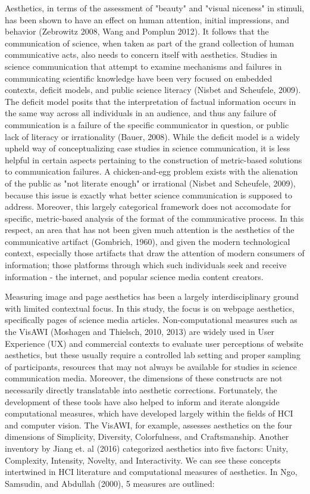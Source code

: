 \documentclass[letterpaper,12pt]{article}
\theoremstyle{definition}
\begin{document}
{Aesthetics, in terms of the assessment of "beauty" and "visual niceness" in stimuli, has been shown to have an effect on human attention, initial impressions, and behavior (Zebrowitz 2008, Wang and Pomplun 2012). It follows that the communication of science, when taken as part of the grand collection of human communicative acts, also needs to concern itself with aesthetics. Studies in science communication that attempt to examine mechanisms and failures in communicating scientific knowledge have been very focused on embedded contexts, deficit models, and public science literacy (Nisbet and Scheufele, 2009). The deficit model posits that the interpretation of factual information occurs in the same way across all individuals in an audience, and thus any failure of communication is a failure of the specific communicator in question, or public lack of literacy or irrationality (Bauer, 2008). While the deficit model is a widely upheld way of conceptualizing case studies in science communication, it is less helpful in certain aspects pertaining to the construction of metric-based solutions to communication failures. A chicken-and-egg problem exists with the alienation of the public as "not literate enough" or irrational (Nisbet and Scheufele, 2009), because this issue is exactly what better science communication is supposed to address. Moreover, this largely categorical framework does not accomodate for specific, metric-based analysis of the format of the communicative process. In this respect, an area that has not been given much attention is the aesthetics of the communicative artifact (Gombrich, 1960), and given the modern technological context, especially those artifacts that draw the attention of modern consumers of information; those platforms through which such individuals seek and receive information - the internet, and popular science media content creators. 

Measuring image and page aesthetics has been a largely interdisciplinary ground with limited contextual focus. In this study, the focus is on webpage aesthetics, specifically pages of science media articles. Non-computational measures such as the VisAWI (Moshagen and Thielsch, 2010, 2013) are widely used in User Experience (UX) and commercial contexts to evaluate user perceptions of website aesthetics, but these usually require a controlled lab setting and proper sampling of participants, resources that may not always be available for studies in science communication media. Moreover, the dimensions of these constructs are not necessarily directly translatable into aesthetic corrections. Fortunately, the development of these tools have also helped to inform and iterate alongside computational measures, which have developed largely within the fields of HCI and computer vision. The VisAWI, for example, assesses aesthetics on the four dimensions of Simplicity, Diversity, Colorfulness, and Craftsmanship. Another inventory by Jiang et. al (2016) categorized aesthetics into five factors: Unity, Complexity, Intensity, Novelty, and Interactivity. We can see these concepts intertwined in HCI literature and computational measures of aesthetics. In Ngo, Samsudin, and Abdullah (2000), 5 measures are outlined:}
\end{document}
